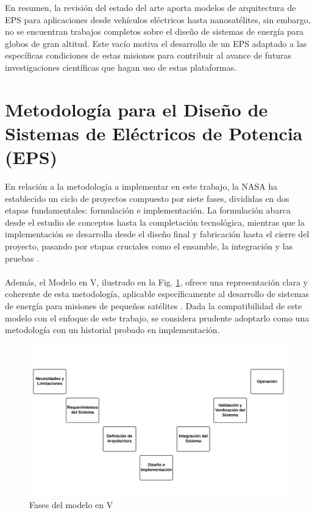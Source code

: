 En resumen, la revisión del estado del arte aporta modelos de arquitectura de EPS para aplicaciones desde vehículos eléctricos hasta nanosatélites, sin embargo, no se encuentran trabajos completos sobre el diseño de sistemas de energía para globos de gran altitud. Este vacío motiva el desarrollo de un EPS adaptado a las específicas condiciones de estas misiones para contribuir al avance de futuras investigaciones científicas que hagan uso de estas plataformas.

\newpage
\section{Metodología para el Diseño de Sistemas de Eléctricos de Potencia (EPS)}

\vspace{0.5 cm}

En relación a la metodología a implementar en este trabajo, la NASA ha establecido un ciclo de proyectos compuesto por siete fases, divididas en dos etapas fundamentales: formulación e implementación. La formulación abarca desde el estudio de conceptos hasta la completación tecnológica, mientras que la implementación se desarrolla desde el diseño final y fabricación hasta el cierre del proyecto, pasando por etapas cruciales como el ensamble, la integración y las pruebas \cite{NASA2016}. \\\\Además, el Modelo en V, ilustrado en la Fig. \ref{fig:fig_modelV}, ofrece una representación clara y coherente de esta metodología, aplicable específicamente al desarrollo de sistemas de energía para misiones de pequeños satélites \cite{IEEE_AESS_Distinguished_Lecture}. Dada la compatibilidad de este modelo con el enfoque de este trabajo, se considera prudente adoptarlo como una metodología con un historial probado en implementación.

\vspace{0.5 cm}

\begin{figure}[h]
  \centering
  \includegraphics[width=\linewidth]{Pictures/ModeloV.png}
  \caption{Fases del modelo en V}
  \label{fig:fig_modelV}
\end{figure}


